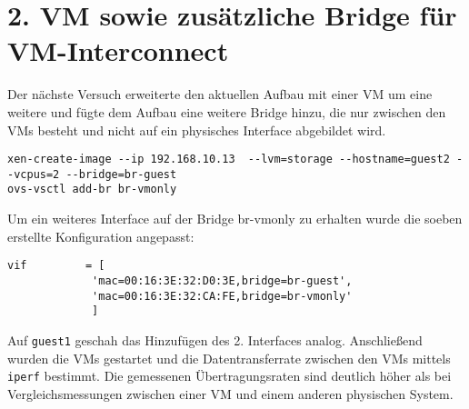 \section{2. VM sowie zusätzliche Bridge für VM-Interconnect}
Der nächste Versuch erweiterte den aktuellen Aufbau mit einer VM um eine weitere und fügte dem Aufbau eine weitere Bridge hinzu, die nur zwischen den VMs besteht und nicht auf ein physisches Interface abgebildet wird.
\begin{verbatim}
xen-create-image --ip 192.168.10.13  --lvm=storage --hostname=guest2 --vcpus=2 --bridge=br-guest
ovs-vsctl add-br br-vmonly
\end{verbatim}
Um ein weiteres Interface auf der Bridge br-vmonly zu erhalten wurde die soeben erstellte Konfiguration angepasst:
\setupVerbatimOut
\begin{verbatim}
vif         = [
    		 'mac=00:16:3E:32:D0:3E,bridge=br-guest',
			 'mac=00:16:3E:32:CA:FE,bridge=br-vmonly' 
             ]
\end{verbatim}
Auf \verb#guest1# geschah das Hinzufügen des 2. Interfaces analog. Anschließend wurden die VMs gestartet und die Datentransferrate zwischen den VMs mittels \verb#iperf# bestimmt. Die gemessenen Übertragungsraten sind deutlich höher als bei Vergleichsmessungen zwischen einer VM und einem anderen physischen System.

